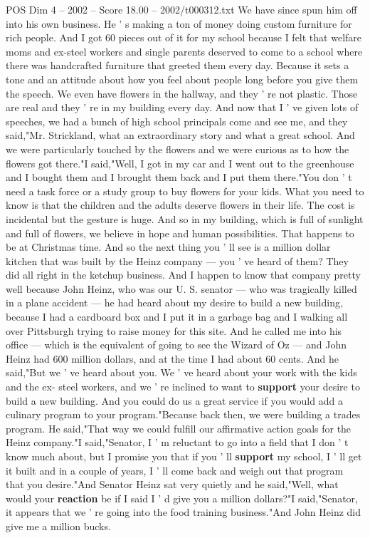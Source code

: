 \begin{textsample}{POS Dim 4 – 2002 – Score 18.00 – 2002/t000312.txt}
We have since spun him off into his own business.
He ' s making a ton of money doing custom furniture for rich people.
And I got 60 pieces out of it for my school because I felt that welfare moms and ex-steel workers and single parents deserved to come to a school where there was handcrafted furniture that greeted them every day.
Because it sets a tone and an attitude about how you feel about people long before you give them the speech.
We even have flowers in the hallway, and they ' re not plastic.
Those are real and they ' re in my building every day.
And now that I ' ve given lots of speeches, we had a bunch of high school principals come and see me, and they said,"Mr.
Strickland, what an extraordinary story and what a great school.
And we were particularly touched by the flowers and we were curious as to how the flowers got there."I said,"Well, I got in my car and I went out to the greenhouse and I bought them and I brought them back and I put them there."You don ' t need a task force or a study group to buy flowers for your kids.
What you need to know is that the children and the adults deserve flowers in their life.
The cost is incidental but the gesture is huge.
And so in my building, which is full of sunlight and full of flowers, we believe in hope and human possibilities.
That happens to be at Christmas time.
And so the next thing you ' ll see is a million dollar kitchen that was built by the Heinz company — you ' ve heard of them?
They did all right in the ketchup business.
And I happen to know that company pretty well because John Heinz, who was our U.
S. senator — who was tragically killed in a plane accident — he had heard about my desire to build a new building, because I had a cardboard box and I put it in a garbage bag and I walking all over Pittsburgh trying to raise money for this site.
And he called me into his office — which is the equivalent of going to see the Wizard of Oz — and John Heinz had 600 million dollars, and at the time I had about 60 cents.
And he said,"But we ' ve heard about you.
We ' ve heard about your work with the kids and the ex- steel workers, and we ' re inclined to want to \textbf{support} your desire to build a new building.
And you could do us a great service if you would add a culinary program to your program."Because back then, we were building a trades program.
He said,"That way we could fulfill our affirmative action goals for the Heinz company."I said,"Senator, I ' m reluctant to go into a field that I don ' t know much about, but I promise you that if you ' ll \textbf{support} my school, I ' ll get it built and in a couple of years, I ' ll come back and weigh out that program that you desire."And Senator Heinz sat very quietly and he said,"Well, what would your \textbf{reaction} be if I said I ' d give you a million dollars?"I said,"Senator, it appears that we ' re going into the food training business."And John Heinz did give me a million bucks.

\end{textsample}

